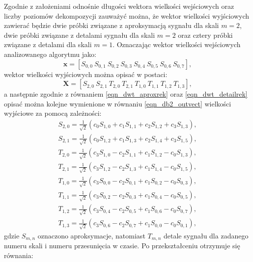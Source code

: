 Zgodnie z założeniami odnośnie długości wektora wielkości wejściowych oraz liczby poziomów dekompozycji zauważyć można, że wektor wielkości wyjściowych zawierać będzie dwie próbki związane z aproksymacją sygnału dla skali $m = 2$, dwie próbki związane z detalami sygnału dla skali $m = 2$ oraz cztery próbki związane z detalami dla skali $m = 1$. Oznaczając wektor wielkości wejściowych analizowanego algorytmu jako:
\begin{equation}
\mathbf{x} = \left[ S_{0,0} ~ S_{0,1} ~ S_{0,2} ~ S_{0,3} ~ S_{0,4} ~ S_{0,5} ~ S_{0,6} ~ S_{0,7} \right] \label{eqn_db2_invect},
\end{equation}
wektor wielkości wyjściowych można opisać w postaci:
\begin{equation}
\mathbf{X} = \left[ S_{2,0} ~ S_{2,1} ~ T_{2,0} ~ T_{2,1} ~ T_{1,0} ~ T_{1,1} ~ T_{1,2} ~ T_{1,3} \right] \label{eqn_db2_outvect},
\end{equation}
a następnie zgodnie z równaniem \eqref{eqn_dwt_aproxrek} oraz \eqref{eqn_dwt_detailrek} opisać można kolejne wymienione w równaniu \eqref{eqn_db2_outvect} wielkości wyjściowe za pomocą zależności:
\begin{gather}
S_{2,0} = \frac{1}{\sqrt{2}} \left( c_0 S_{1,0} + c_1 S_{1,1} + c_2 S_{1,2} + c_3 S_{1,3} \right) \label{eqn_db2_outvect_s_2_0}, \\
S_{2,1} = \frac{1}{\sqrt{2}} \left( c_0 S_{1,2} + c_1 S_{1,3} + c_2 S_{1,4} + c_3 S_{1,5} \right) \label{eqn_db2_outvect_s_2_1}, \\
T_{2,0} = \frac{1}{\sqrt{2}} \left( c_3 S_{1,0} - c_2 S_{1,1} + c_1 S_{1,2} - c_0 S_{1,3} \right) \label{eqn_db2_outvect_t_2_0}, \\
T_{2,1} = \frac{1}{\sqrt{2}} \left( c_3 S_{1,2} - c_2 S_{1,3} + c_1 S_{1,4} - c_0 S_{1,5} \right) \label{eqn_db2_outvect_t_2_1}, \\
T_{1,0} = \frac{1}{\sqrt{2}} \left( c_3 S_{0,0} - c_2 S_{0,1} + c_1 S_{0,2} - c_0 S_{0,3} \right) \label{eqn_db2_outvect_t_1_0}, \\
T_{1,1} = \frac{1}{\sqrt{2}} \left( c_3 S_{0,2} - c_2 S_{0,3} + c_1 S_{0,4} - c_0 S_{0,5} \right) \label{eqn_db2_outvect_t_1_1}, \\
T_{1,2} = \frac{1}{\sqrt{2}} \left( c_3 S_{0,4} - c_2 S_{0,5} + c_1 S_{0,6} - c_0 S_{0,7} \right) \label{eqn_db2_outvect_t_1_2}, \\
T_{1,3} = \frac{1}{\sqrt{2}} \left( c_3 S_{0,6} - c_2 S_{0,7} + c_1 S_{0,0} - c_0 S_{0,1} \right) \label{eqn_db2_outvect_t_1_3},
\end{gather}
gdzie $S_{m,n}$ oznaczono aproksymacje, natomiast $T_{m,n}$ detale sygnału dla zadanego numeru skali i numeru przesunięcia w czasie. Po przekształceniu otrzymuje się równania:
